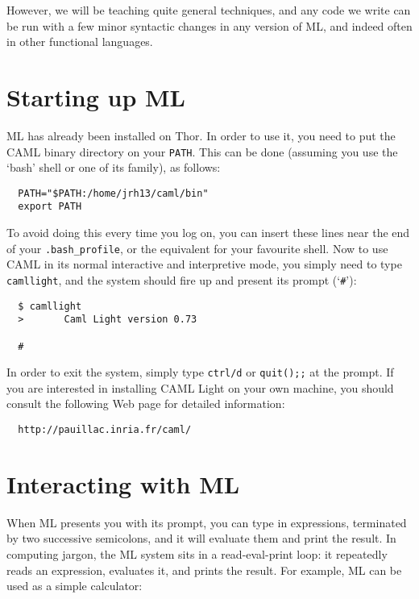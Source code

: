 However, we will be teaching quite general techniques, and any code we write
can be run with a few minor syntactic changes in any version of ML, and indeed
often in other functional languages.

\section{Starting up ML}

ML has already been installed on Thor. In order to use it, you need to put the
CAML binary directory on your {\tt PATH}. This can be done (assuming you use
the `bash' shell or one of its family), as follows:

\begin{boxed}\begin{verbatim}
  PATH="$PATH:/home/jrh13/caml/bin"
  export PATH
\end{verbatim}\end{boxed}

To avoid doing this every time you log on, you can insert these lines near the
end of your {\tt .bash\_profile}, or the equivalent for your favourite shell.
Now to use CAML in its normal interactive and interpretive mode, you simply
need to type {\tt camllight}, and the system should fire up and present its
prompt (`{\tt \#}'):

\begin{boxed}\begin{verbatim}
  $ camllight
  >       Caml Light version 0.73

  #
\end{verbatim}\end{boxed}

In order to exit the system, simply type {\tt ctrl/d} or {\tt quit();;} at the
prompt. If you are interested in installing CAML Light on your own machine, you
should consult the following Web page for detailed information:

\begin{boxed}\begin{verbatim}
  http://pauillac.inria.fr/caml/
\end{verbatim}\end{boxed}

\section{Interacting with ML}

When ML presents you with its prompt, you can type in expressions, terminated
by two successive semicolons, and it will evaluate them and print the result.
In computing jargon, the ML system sits in a read-eval-print loop: it
repeatedly reads an expression, evaluates it, and prints the result. For
example, ML can be used as a simple calculator:

